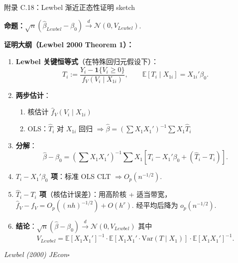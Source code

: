 \documentclass[aspectratio=169, 10pt]{beamer}
\begin{document}
\begin{frame}{附录 C.18：Lewbel 渐近正态性证明 sketch}
  \hypertarget{proof-c18}{}

  \textbf{命题：}$\sqrt{n}(\hat\beta_{Lewbel} - \beta_0) \overset{d}{\to} \mathcal{N}(0, V_{Lewbel})$.

  \textbf{证明大纲（Lewbel 2000 Theorem 1）：}
  \begin{enumerate}\setlength{\itemsep}{1pt}
    \item \textbf{Lewbel 关键恒等式}（在特殊回归元假设下）：
    $$T_i := \frac{Y_i - \mathbf{1}\{V_i \geq 0\}}{f_V(V_i \mid X_{1i})}, \qquad
    \mathbb{E}[T_i \mid X_{1i}] = X_{1i}'\beta_0.$$

    \item \textbf{两步估计}：
    \begin{enumerate}
      \item 核估计 $\hat f_V(V_i \mid X_{1i})$
      \item OLS：$\hat T_i$ 对 $X_{1i}$ 回归 $\Rightarrow \hat\beta = (\sum X_1 X_1')^{-1} \sum X_1 \hat T_i$
    \end{enumerate}

    \item \textbf{分解}：
    $$\hat\beta - \beta_0 = (\sum X_1 X_1')^{-1} \sum X_1 [T_i - X_1'\beta_0 + (\hat T_i - T_i)].$$

    \item \textbf{$T_i - X_1'\beta_0$ 项}：标准 OLS CLT $\Rightarrow O_p(n^{-1/2})$.

    \item \textbf{$\hat T_i - T_i$ 项}（核估计误差）：用高阶核 + 适当带宽，$\hat f_V - f_V = O_p((nh)^{-1/2}) + O(h^r)$.
    经平均后降为 $o_p(n^{-1/2})$.

    \item \textbf{结论}：$\sqrt{n}(\hat\beta - \beta_0) \overset{d}{\to} \mathcal{N}(0, V_{Lewbel})$
    其中
    $$V_{Lewbel} = \mathbb{E}[X_1 X_1']^{-1} \cdot \mathbb{E}[X_1 X_1' \cdot \text{Var}(T \mid X_1)] \cdot \mathbb{E}[X_1 X_1']^{-1}.$$
  \end{enumerate}

  \hfill{\scriptsize\textit{Lewbel (2000) JEcon}}\quad$\square$
  \hfill{\scriptsize\hyperlink{main-c18}{}}

\end{frame}
\end{document}

